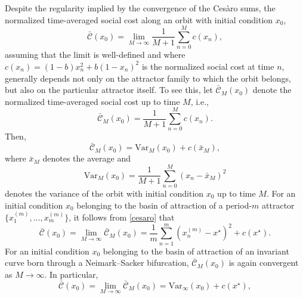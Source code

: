 \documentclass{article}
\theoremstyle{plain}
\theoremstyle{definition}
\begin{document}
Despite the regularity implied by the convergence of the Ces\`aro sums, the normalized time-averaged social cost along an orbit with initial condition $x_0$,
\begin{equation}
\bar{\mathcal{C}}(x_0)=\lim_{M \to \infty}\frac{1}{M+1}\sum_{n=0}^{M}c(x_n),
\end{equation}
assuming that the limit is well-defined and where $c(x_n)=(1-b)x_n^2+b(1-x_n)^2$ is the normalized social cost at time $n$, generally depends not only on the attractor family to which the orbit belongs, but also on the particular attractor itself. To see this, let $\bar{\mathcal{C}}_M(x_0)$ denote the normalized time-averaged social cost up to time $M$, i.e.,
\begin{equation}
\bar{\mathcal{C}}_M(x_0)=\frac{1}{M+1}\sum_{n=0}^{M}c(x_n).
\label{soc_cost}
\end{equation}
Then,
\begin{equation}
\bar{\mathcal{C}}_M(x_0)=\mathrm{Var}_M(x_0)+c(\bar{x}_M),
\label{soc_cost_2}
\end{equation}
where $\bar{x}_M$ denotes the average and
\begin{equation}
\mathrm{Var}_M(x_0)=\frac{1}{M+1}\sum_{n=0}^M(x_n-\bar x_M)^2
\end{equation}
denotes the variance of the orbit with initial condition $x_0$ up to time $M$. For an initial condition $x_0$ belonging to the basin of attraction of a period-$m$ attractor $\{x_1^{(m)},\dots,x_m^{(m)}\}$, it follows from \eqref{cesaro} that
\begin{equation}
\bar{\mathcal{C}}(x_0)
=
\lim_{M\to\infty}\bar{\mathcal{C}}_M(x_0)
=
\frac{1}{m}\sum_{n=1}^{m}\left(x_n^{(m)}-x^\star\right)^2+c(x^\star).
\label{soc_per_m}
\end{equation}
For an initial condition $x_0$ belonging to the basin of attraction of an invariant curve born through a Neimark--Sacker bifurcation, $\bar{\mathcal{C}}_M(x_0)$ is again convergent as $M\to\infty$. In particular,
\begin{equation}
\bar{\mathcal{C}}(x_0)
=
\lim_{M\to\infty}\bar{\mathcal{C}}_M(x_0)
=
\mathrm{Var}_{\infty}(x_0)+c(x^\star),
\label{soc_per_ch}
\end{equation}
\end{document}
